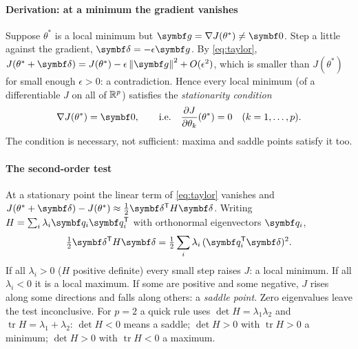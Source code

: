 \documentclass[11pt]{article}
\newcommand{\gvec}{\vect{g}}
\newcommand{\dvec}{\vect{\delta}}
\newcommand{\qvec}{\vect{q}}
\begin{document}
\paragraph{Derivation: at a minimum the gradient vanishes} Suppose $\theta^*$ is a local minimum but
$\gvec = \nabla J(\theta^*) \ne \vect{0}$. Step a little against the gradient, $\dvec = -\epsilon\gvec$. By
\eqref{eq:taylor}, $J(\theta^* + \dvec) = J(\theta^*) - \epsilon\norm{\gvec}^2 + O(\epsilon^2)$, which is smaller than
$J(\theta^*)$ for small enough $\epsilon > 0$: a contradiction. Hence every local minimum (of a differentiable $J$ on
all of $\mathbb{R}^p$) satisfies the \emph{stationarity condition}
\[
  \nabla J(\theta^*) = \vect{0}, \qquad \text{i.e.}\quad \frac{\partial J}{\partial\theta_k}(\theta^*) = 0 \quad (k = 1, \dots, p).
\]
The condition is necessary, not sufficient: maxima and saddle points satisfy it too.

\paragraph{The second-order test} At a stationary point the linear term of \eqref{eq:taylor} vanishes and
$J(\theta^* + \dvec) - J(\theta^*) \approx \frac12\dvec\T H\dvec$. Writing $H = \sum_i \lambda_i \qvec_i\qvec_i\T$ with
orthonormal eigenvectors $\qvec_i$,
\[
  \tfrac12\dvec\T H\dvec = \tfrac12\sum_i \lambda_i\, (\qvec_i\T\dvec)^2 .
\]
If all $\lambda_i > 0$ ($H$ positive definite) every small step raises $J$: a local minimum. If all $\lambda_i < 0$ it is
a local maximum. If some are positive and some negative, $J$ rises along some directions and falls along others: a
\emph{saddle point}. Zero eigenvalues leave the test inconclusive. For $p = 2$ a quick rule uses
$\det H = \lambda_1\lambda_2$ and $\operatorname{tr} H = \lambda_1 + \lambda_2$: $\det H < 0$ means a saddle;
$\det H > 0$ with $\operatorname{tr} H > 0$ a minimum; $\det H > 0$ with $\operatorname{tr} H < 0$ a maximum.
\end{document}
